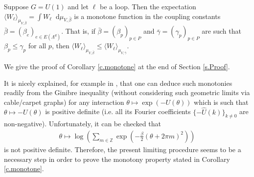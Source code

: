 \documentclass[11pt]{preprint}
\def\scal#1{{\langle#1\rangle}}
\newcommand{\mrd}{\mathop{}\!\mathrm{d}}
\def\Z{\mathbb{Z}}
\begin{document}
\begin{corollary}\label{c.monotone}
Suppose $G=U(1)$ and let $\ell$ be a loop.
Then the expectation $\scal{W_\ell}_{\mu_{V,\bar\beta}} = \int W_\ell\mrd \mu_{V,\bar\beta}$ is a monotone function in the coupling constants $\bar \beta = (\beta_e)_{e\in E(\Lambda^d)}$.
That is, if $\bar \beta = (\beta_p)_{p\in P}$ and $\bar \gamma = (\gamma_p)_{p\in P}$ are such that $\beta_p \leq \gamma_p$ for all  $p$,
then $\scal{W_\ell}_{\mu_{V,\bar\beta}} \leq \scal{W_\ell}_{\mu_{V,\bar\gamma}}$.
\end{corollary} 
%
We give the proof of Corollary \ref{c.monotone} at the end of Section \ref{s.Proof}.

\begin{remark}\label{r.monotone}
It is nicely explained, for example in \cite{van2023duality}, that one can deduce such monotonies readily from the Ginibre inequality (without considering such geometric limits via cable/carpet graphs) for any interaction  $\theta \mapsto \exp(- U(\theta))$ which is such that $\theta \mapsto -U(\theta)$ is positive definite (i.e. all its Fourier coefficients $\{- \hat U (k)\}_{k\neq 0}$ are non-negative).
Unfortunately, it can be checked that 
\begin{align*}
\theta \mapsto  \log \left(\sum_{m \in \Z} \exp(-\frac \beta 2 (\theta + 2\pi m)^2) \right) 
\end{align*}
is not positive definite. Therefore, the present limiting procedure seems to be a necessary step in order to prove the monotony property stated in Corollary \ref{c.monotone}. 
\end{remark}
\end{document}
